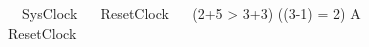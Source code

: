 \documentclass{llncs}
\begin{document}
\begin{circus}%
  \circprocess\ ~SysClock ~\circdef~\circbegin
  ResetClock ~\circdef~ \lcircguard \lnot (2+5 > 3+3) \land ((3-1) = 2) \rcircguard \circguard A\\
  \circspot ResetClock
  \circend
\end{circus}
\end{document}
